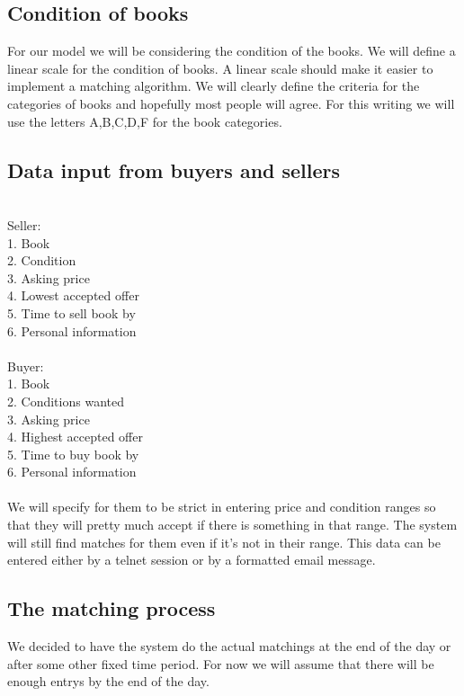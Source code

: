 \subsection{Condition of books}

For our model we will be considering the condition of the books.  We will
define a linear scale for the condition of books.  A linear scale should make
it easier to implement a matching algorithm.  We will clearly define the
criteria for the categories of books and hopefully most people will agree.  For
this writing we will use the letters A,B,C,D,F for the book categories.

\subsection{Data input from buyers and sellers}
\\
Seller:\\
1.	Book\\
2.	Condition\\
3.	Asking price\\
4.	Lowest accepted offer\\
5.	Time to sell book by\\
6.	Personal information\\
\\
Buyer:\\
1.	Book\\
2.	Conditions wanted\\
3.	Asking price\\
4.	Highest accepted offer\\
5.	Time to buy book by\\
6.	Personal information\\
\\

We will specify for them to be strict in entering price and condition ranges so
that they will pretty much accept if there is something in that range.  The
system will still find matches for them even if it's not in their range.
This data can be entered either by a telnet session or by a formatted email
message.

\subsection{The matching process}

We decided to have the system do the actual matchings at the end of the day or
after some other fixed time period.  For now we will assume that there will be
enough entrys by the end of the day.

